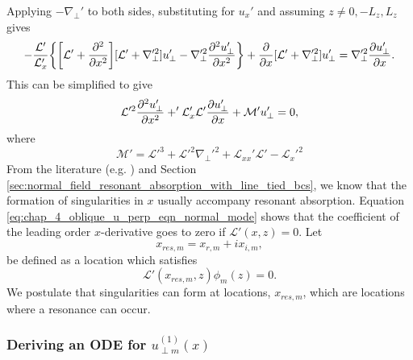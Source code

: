 Applying $-\nabla_\perp'$ to both sides, substituting for $u_x'$ and assuming $z\ne0,-L_z,L_z$ gives
\[-\frac{\mathcal{L}'}{\mathcal{L}_x'}\qty{\qty[\mathcal{L}'+\pdv[2]{}{x}][\mathcal{L}'+\nabla_\perp'^2]u_\perp'-\nabla_\perp'^2\pdv[2]{u_\perp'}{x}}+\pdv{}{x}[\mathcal{L}'+\nabla_\perp'^2]u_\perp'=\nabla_\perp'^2\pdv{u_\perp'}{x}.\]
This can be simplified to give
\begin{equation}
    \label{eq:chap_4_oblique_u_perp_eqn_normal_mode}
     \mathcal{L}'^2\pdv[2]{u_\perp'}{x}+'\mathcal{L}_x'\mathcal{L}'\pdv{u_\perp'}{x}+\mathcal{M}'u_\perp'=0,
\end{equation}
where
\begin{equation}
    \mathcal{M}' = \mathcal{L}'^3+\mathcal{L}'^2\nabla_\perp'^2+\mathcal{L}_{xx}'\mathcal{L}'-\mathcal{L}_x'^2
\end{equation}
From the literature (e.g. \citealt{Thompson1993,Wright1996}) and Section \ref{sec:normal_field_resonant_absorption_with_line_tied_bcs}, we know that the formation of singularities in $x$ usually accompany resonant absorption. Equation \eqref{eq:chap_4_oblique_u_perp_eqn_normal_mode} shows that the coefficient of the leading order $x$-derivative goes to zero if $\mathcal{L}'(x,z)=0$. Let
\[x_{res,m} = x_{r,m} + i x_{i,m},\]
be defined as a location which satisfies
\begin{equation}
    \label{eq:x_res_defn}
    \mathcal{L}'(x_{res,m},z)\phi_m(z)=0.
\end{equation}
We postulate that singularities can form at locations, $x_{res,m}$, which are locations where a resonance can occur.

\subsubsection{Deriving an ODE for $u_{\perp m}^{(1)}(x)$}

